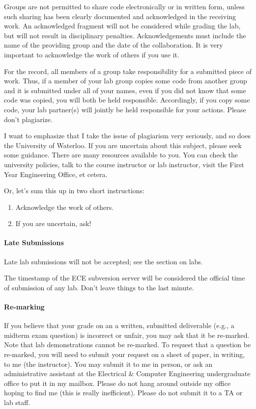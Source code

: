 \documentclass[letterpaper,10pt]{article}
\begin{document}
Groups are not permitted to share code electronically or in written form, unless such sharing has been clearly documented and acknowledged in the receiving work. An acknowledged fragment will not be considered while grading the lab, but will not result in disciplinary penalties. Acknowledgements must include the name of the providing group and the date of the collaboration. It is very important to acknowledge the work of others if you use it.

For the record, all members of a group take responsibility for a submitted piece of work. Thus, if a member of your lab group copies some code from another group and it is submitted under all of your names, even if you did not know that some code was copied, you will both be held responsible. Accordingly, if you copy some code, your lab partner(s) will jointly be held responsible for your actions. Please don't plagiarize.

I want to emphasize that I take the issue of plagiarism very seriously, and so does the University of Waterloo. If you are uncertain about this subject, please seek some guidance. There are many resources available to you. You can check the university policies, talk to the course instructor or lab instructor, visit the First Year Engineering Office, et cetera.

Or, let's sum this up in two short instructions:
\begin{enumerate}
	\item Acknowledge the work of others. 
	\item If you are uncertain, ask!
\end{enumerate}

\paragraph{Late Submissions} Late lab submissions will not be accepted; see the section on labs.

The timestamp of the ECE subversion server will be considered the official time of submission of any lab. Don't leave things to the last minute.

\paragraph{Re-marking}
If you believe that your grade on an a written, submitted deliverable (e.g., a midterm exam question) is incorrect or unfair, you may ask that it be re-marked. Note that lab demonstrations cannot be re-marked. To request that a question be re-marked, you will need to submit your request on a sheet of paper, in writing, to me (the instructor). You may submit it to me in person, or ask an administrative assistant at the Electrical \& Computer Engineering undergraduate office to put it in my mailbox. Please do not hang around outside my office hoping to find me (this is really inefficient). Please do not submit it to a TA or lab staff. 
\end{document}
